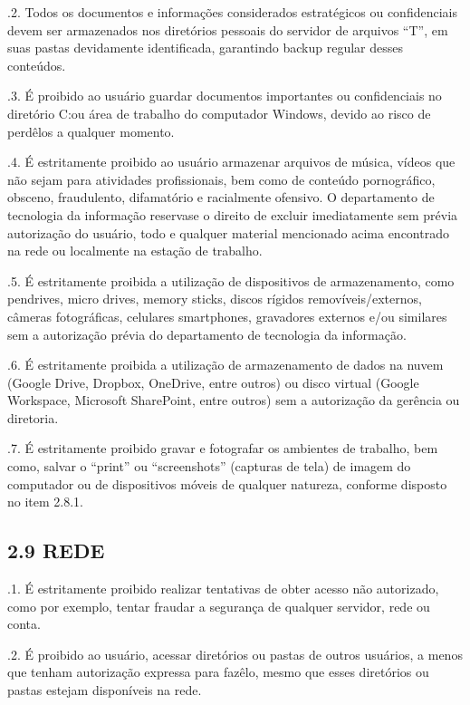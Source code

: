 \documentclass[letterpaper,10pt,brazil]{sphinxmanual}
\begin{document}
.2. Todos os documentos e informações considerados estratégicos ou confidenciais devem ser armazenados nos diretórios pessoais do servidor de arquivos “T”, em suas pastas devidamente identificada, garantindo backup regular desses conteúdos.

.3. É proibido ao usuário guardar documentos importantes ou confidenciais no diretório C:ou área de trabalho do computador Windows, devido ao risco de perdê\sphinxhyphen{}los a qualquer momento.

.4. É estritamente proibido ao usuário armazenar arquivos de música, vídeos que não sejam para atividades profissionais, bem como de conteúdo pornográfico, obsceno, fraudulento, difamatório e racialmente ofensivo. O departamento de tecnologia da informação reserva\sphinxhyphen{}se o direito de excluir imediatamente sem prévia autorização do usuário, todo e qualquer material mencionado acima encontrado na rede ou localmente na estação de trabalho.

.5. É estritamente proibida a utilização de dispositivos de armazenamento, como pendrives, micro drives, memory sticks, discos rígidos removíveis/externos, câmeras fotográficas, celulares smartphones, gravadores externos e/ou similares sem a autorização prévia do departamento de tecnologia da informação.

.6. É estritamente proibida a utilização de armazenamento de dados na nuvem (Google Drive, Dropbox, OneDrive, entre outros) ou disco virtual (Google Workspace, Microsoft SharePoint, entre outros) sem a autorização da gerência ou diretoria.

.7. É estritamente proibido gravar e fotografar os ambientes de trabalho, bem como, salvar o “print” ou “screenshots” (capturas de tela) de imagem do computador ou de dispositivos móveis de qualquer natureza, conforme disposto no item 2.8.1.


\subsection{2.9 REDE}
\label{\detokenize{regras:id9}}
.1. É estritamente proibido realizar tentativas de obter acesso não autorizado, como por exemplo, tentar fraudar a segurança de qualquer servidor, rede ou conta.

.2. É proibido ao usuário, acessar diretórios ou pastas de outros usuários, a menos que tenham autorização expressa para fazê\sphinxhyphen{}lo, mesmo que esses diretórios ou pastas estejam disponíveis na rede.
\end{document}

